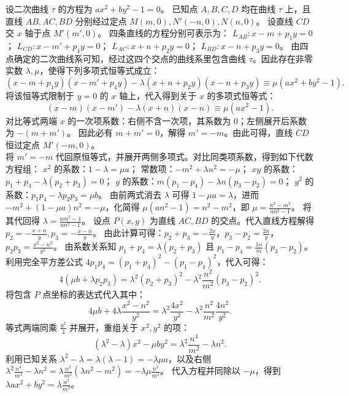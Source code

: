 \begin{solution}
设二次曲线 $\tau$ 的方程为 $ax^2 + by^2 - 1 = 0$。
已知点 $A,B,C,D$ 均在曲线 $\tau$ 上，且直线 $AB, AC, BD$ 分别经过定点 $M(m,0), N'(-n,0), N(n,0)$。
设直线 $CD$ 交 $x$ 轴于点 $M'(m',0)$。
四条直线的方程分别可表示为：
$L_{AB}: x - m + p_1 y = 0$；
$L_{CD}: x - m' + p_4 y = 0$；
$L_{AC}: x + n + p_2 y = 0$；
$L_{BD}: x - n + p_3 y = 0$。
由四点确定的二次曲线系可知，经过这四个交点的曲线系里包含曲线 $\tau$。因此存在非零实数 $\lambda, \mu$，使得下列多项式恒等式成立：
\[ (x - m + p_1 y)(x - m' + p_4 y) - \lambda (x + n + p_2 y)(x - n + p_3 y) \equiv \mu (ax^2 + by^2 - 1). \]
将该恒等式限制于 $y = 0$ 的 $x$ 轴上，代入得到关于 $x$ 的多项式恒等式：
\[ (x - m)(x - m') - \lambda (x + n)(x - n) \equiv \mu (ax^2 - 1). \]
对比等式两端 $x$ 的一次项系数：右侧不含一次项，其系数为 $0$；左侧展开后系数为 $-(m + m')$。
因此必有 $m + m' = 0$，解得 $m' = -m$。由此可得，直线 $CD$ 恒过定点 $M'(-m,0)$。\\
将 $m' = -m$ 代回原恒等式，并展开两侧多项式。对比同类项系数，得到如下代数方程组：
$x^2$ 的系数：$1 - \lambda = \mu a$；
常数项：$-m^2 + \lambda n^2 = -\mu$；
$xy$ 的系数：$p_1 + p_4 - \lambda(p_2 + p_3) = 0$；
$y$ 的系数：$m(p_1 - p_4) - \lambda n(p_3 - p_2) = 0$；
$y^2$ 的系数：$p_1 p_4 - \lambda p_2 p_3 = \mu b$。
由前两式消去 $\lambda$ 可得 $1 - \mu a = \lambda$，进而 $-m^2 + (1 - \mu a)n^2 = -\mu$，化简得 $\mu(an^2 - 1) = n^2 - m^2$，即 $\mu = \frac{n^2 - m^2}{an^2 - 1}$。
将其代回得 $\lambda = \frac{am^2 - 1}{an^2 - 1}$。
设点 $P(x,y)$ 为直线 $AC, BD$ 的交点。代入直线方程解得 $p_2 = -\frac{x+n}{y}, p_3 = -\frac{x-n}{y}$。
由此计算可得：$p_2 + p_3 = -\frac{2x}{y}$，$p_3 - p_2 = \frac{2n}{y}$，$p_2 p_3 = \frac{x^2 - n^2}{y^2}$。
由系数关系知 $p_1 + p_4 = \lambda(p_2 + p_3)$ 且 $p_1 - p_4 = \frac{\lambda n}{m}(p_3 - p_2)$。
利用完全平方差公式 $4 p_1 p_4 = (p_1 + p_4)^2 - (p_1 - p_4)^2$，代入可得：
\[ 4(\mu b + \lambda p_2 p_3) = \lambda^2 (p_2 + p_3)^2 - \lambda^2 \frac{n^2}{m^2} (p_3 - p_2)^2. \]
将包含 $P$ 点坐标的表达式代入其中：
\[ 4\mu b + 4\lambda \frac{x^2 - n^2}{y^2} = \lambda^2 \frac{4x^2}{y^2} - \lambda^2 \frac{n^2}{m^2} \frac{4n^2}{y^2}. \]
等式两端同乘 $\frac{y^2}{4}$ 并展开，重组关于 $x^2, y^2$ 的项：
\[ (\lambda^2 - \lambda)x^2 - \mu b y^2 = \lambda^2 \frac{n^4}{m^2} - \lambda n^2. \]
利用已知关系 $\lambda^2 - \lambda = \lambda(\lambda - 1) = -\lambda \mu a$，以及右侧 $\lambda^2 \frac{n^4}{m^2} - \lambda n^2 = \lambda \frac{n^2}{m^2}(\lambda n^2 - m^2) = -\lambda \mu \frac{n^2}{m^2}$。
代入方程并同除以 $-\mu$，得到 $\lambda a x^2 + b y^2 = \lambda \frac{n^2}{m^2}$。

\end{solution}
